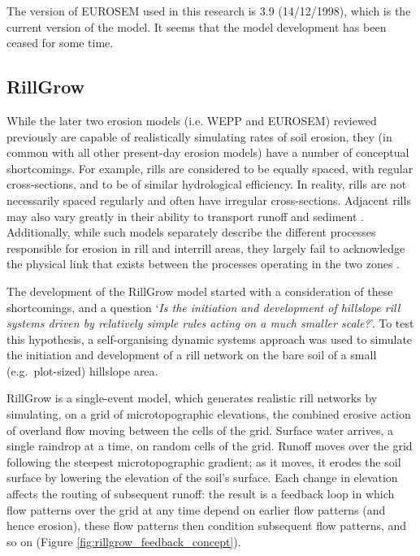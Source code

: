 The version of EUROSEM used in this research is 3.9 (14/12/1998), which is the
current version of the model. It seems that the model development has been
ceased for some time.

\subsection{RillGrow}
\label{sec:ModelDescriptionRillGrow}

While the later two erosion models (i.e. WEPP and EUROSEM) reviewed previously
are capable of realistically simulating rates of soil erosion, they (in common
with all other present-day erosion models) have a number of conceptual
shortcomings. For example, rills are considered to be equally spaced, with
regular cross-sections, and to be of similar hydrological efficiency. In
reality, rills are not necessarily spaced regularly and often have irregular
cross-sections. Adjacent rills may also vary greatly in their ability to
transport runoff and sediment \citep{favis-mortlock1996-248}. Additionally,
while such models separately describe the different processes responsible for
erosion in rill and interrill areas, they largely fail to acknowledge the
physical link that exists between the processes operating in the two zones
\citep{favis2000-2173}.

The development of the RillGrow model
\citep{favis-mortlock1996-248,favis1998-353,favis2000-2173,
favis-mortlock2003-127,favis-mortlock2004-349} started with a consideration of
these shortcomings, and a question `\emph{Is the initiation and development of
hillslope rill systems driven by relatively simple rules acting on a much
smaller scale?}'. To test this hypothesis, a self-organising dynamic systems
approach was used to simulate the initiation and development of a rill network
on the bare soil of a small (e.g.\ plot-sized) hillslope area.

RillGrow is a single-event model, which generates realistic rill networks by
simulating, on a grid of microtopographic elevations, the combined erosive
action of overland flow moving between the cells of the grid. Surface water
arrives, a single raindrop at a time, on random cells of the grid. Runoff moves
over the grid following the steepest microtopographic gradient; as it moves, it
erodes the soil surface by lowering the elevation of the soil's surface. Each
change in elevation affects the routing of subsequent runoff: the result is a
feedback loop in which flow patterns over the grid at any time depend on earlier
flow patterns (and hence erosion), these flow patterns then condition subsequent
flow patterns, and so on (Figure \ref{fig:rillgrow_feedback_concept}).

